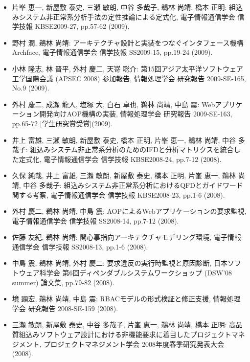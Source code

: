 \documentclass{jarticle}
\begin{document}
\begin{itemize}
\item 片峯 恵一, 新屋敷 泰史, 三瀬 敏朗, 中谷 多哉子, 鵜林 尚靖, 橋本 正明:
組込みシステム非正常系分析手法の定性推論による定式化,
電子情報通信学会 信学技報 KBSE2009-27, pp.57-62 (2009).

\item 野村 潤, 鵜林 尚靖:
アーキテクチャ設計と実装をつなぐインタフェース機構 Archface,
電子情報通信学会 信学技報 SS2009-15, pp.19-24 (2009).

\item 小林 隆志, 林 晋平, 外村 慶二, 天嵜 聡介:
第15回アジア太平洋ソフトウェア工学国際会議 (APSEC 2008) 参加報告,
情報処理学会 研究報告 2009-SE-165, No.9 (2009).

\item 外村 慶二, 成瀬 龍人, 塩塚 大, 白石 卓也, 鵜林 尚靖, 中島 震:
Webアプリケーション開発向けAOP機構の実装,
情報処理学会 研究報告 2009-SE-163, pp.65-72 [学生研究賞受賞](2009).

\item 井上 富雄, 三瀬 敏朗, 新屋敷 泰史, 橋本 正明, 片峯 恵一, 鵜林 尚靖, 中谷 多哉子:
組込みシステム非正常系分析のためのIFDと分析マトリクスを統合した定式化,
電子情報通信学会 信学技報 KBSE2008-24, pp.7-12 (2008).

\item 久保 純哉, 井上 富雄, 三瀬 敏朗, 新屋敷 泰史, 橋本 正明, 片峯 恵一, 鵜林 尚靖, 中谷 多哉子:
組込みシステム非正常系分析におけるQFDとガイドワード関する考察,
電子情報通信学会 信学技報 KBSE2008-23, pp.1-6 (2008).

\item 外村 慶二, 鵜林 尚靖, 中島 震:
AOPによるWebアプリケーションの要求監視,
電子情報通信学会 信学技報 SS2008-14, pp.7-12 (2008).

\item 佐藤 友紀, 鵜林 尚靖:
関心事指向アーキテクチャモデリング環境,
電子情報通信学会 信学技報 SS2008-13, pp.1-6 (2008).

\item 中島 震, 鵜林 尚靖, 外村 慶二:
要求違反の実行時監視と原因診断,
日本ソフトウェア科学会 第6回ディペンダブルシステムワークショップ (DSW'08 summer) 論文集, pp.79-82 (2008).

\item 境 顕宏, 鵜林 尚靖, 中島 震:
RBACモデルの形式検証と修正支援,
情報処理学会 研究報告 2008-SE-159 (2008).

\item 三瀬 敏朗, 新屋敷 泰史, 中谷 多哉子, 片峯 恵一, 鵜林 尚靖, 橋本 正明:
高品質組込みソフトウェア設計における非機能要求に着目したプロジェクトマネジメント,
プロジェクトマネジメント学会 2008年度春季研究発表大会 (2008).


\end{itemize}
\end{document}
